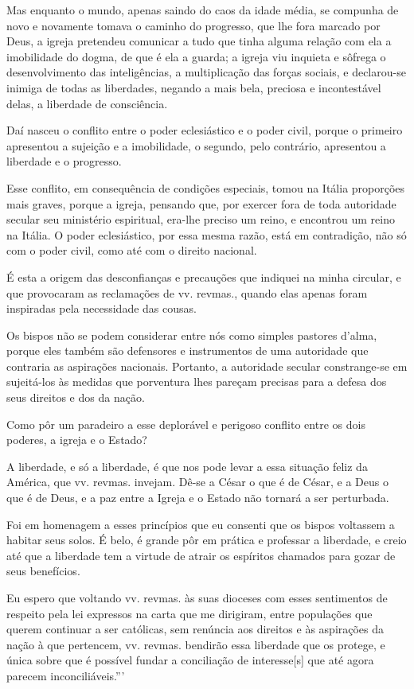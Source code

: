 Mas enquanto o mundo, apenas saindo do caos da idade média, se compunha
de novo e novamente tomava o caminho do progresso, que lhe fora marcado
por Deus, a igreja pretendeu comunicar a tudo que tinha alguma relação
com ela a imobilidade do dogma, de que é ela a guarda; a igreja viu
inquieta e sôfrega o desenvolvimento das inteligências, a multiplicação
das forças sociais, e declarou-se inimiga de todas as liberdades,
negando a mais bela, preciosa e incontestável delas, a liberdade de
consciência.

Daí nasceu o conflito entre o poder eclesiástico e o poder civil, porque
o primeiro apresentou a sujeição e a imobilidade, o segundo, pelo
contrário, apresentou a liberdade e o progresso.

Esse conflito, em consequência de condições especiais, tomou na Itália
proporções mais graves, porque a igreja, pensando que, por exercer fora
de toda autoridade secular seu ministério espiritual, era-lhe preciso um
reino, e encontrou um reino na Itália. O poder eclesiástico, por essa
mesma razão, está em contradição, não só com o poder civil, como até com
o direito nacional.

É esta a origem das desconfianças e precauções que indiquei na minha
circular, e que provocaram as reclamações de vv. revmas., quando elas
apenas foram inspiradas pela necessidade das cousas.

Os bispos não se podem considerar entre nós como simples pastores
d'alma, porque eles também são defensores e instrumentos de uma
autoridade que contraria as aspirações nacionais. Portanto, a autoridade
secular constrange-se em sujeitá-los às medidas que porventura lhes
pareçam precisas para a defesa dos seus direitos e dos da nação.

Como pôr um paradeiro a esse deplorável e perigoso conflito entre os
dois poderes, a igreja e o Estado?

A liberdade, e só a liberdade, é que nos pode levar a essa situação
feliz da América, que vv. revmas. invejam. Dê-se a César o que é de
César, e a Deus o que é de Deus, e a paz entre a Igreja e o Estado não
tornará a ser perturbada.

Foi em homenagem a esses princípios que eu consenti que os bispos
voltassem a habitar seus solos. É belo, é grande pôr em prática e
professar a liberdade, e creio até que a liberdade tem a virtude de
atrair os espíritos chamados para gozar de seus benefícios.

Eu espero que voltando vv. revmas. às suas dioceses com esses
sentimentos de respeito pela lei expressos na carta que me dirigiram,
entre populações que querem continuar a ser católicas, sem renúncia aos
direitos e às aspirações da nação à que pertencem, vv. revmas. bendirão
essa liberdade que os protege, e única sobre que é possível fundar a
conciliação de interesse{[}s{]} que até agora parecem inconciliáveis.'''


